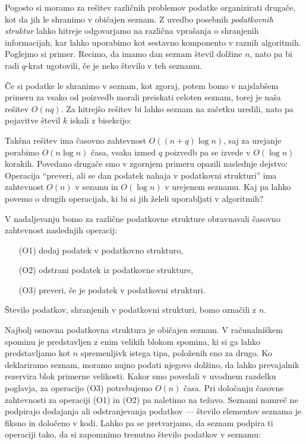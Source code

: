 Pogosto si moramo za rešitev različnih problemov podatke organizirati drugače,
kot da jih le shranimo v običajen seznam.
Z uvedbo posebnih \emph{podatkovnih struktur} lahko hitreje odgovarjamo na
različna vprašanja o shranjenih informacijah, kar lahko uporabimo kot sestavno
komponento v raznih algoritmih.
Poglejmo si primer.
Recimo, da imamo dan seznam števil dolžine $n$, nato pa bi radi $q$-krat
ugotovili, če je neko število v teh seznamu.


Če si podatke le shranimo v seznam, kot zgoraj, potem bomo v najslabšem primeru
za vsako od poizvedb morali preiskati celoten seznam, torej je naša rešitev
$O(nq)$.
Za hitrejšo rešitev bi lahko seznam na začetku uredili, nato pa pojavitve števil
$k$ iskali z bisekcijo:


Takšna rešitev ima časovno zahtevnost $O((n + q) \log n)$, saj za urejanje
porabimo $O(n \log n)$ časa, vsaka izmed $q$ poizvedb pa se izvede v $O(\log n)$
korakih.
Povedano drugače smo v zgornjem primeru opazili naslednje dejstvo:
Operacija \enquote{preveri, ali se dan podatek nahaja v podatkovni strukturi}
ima zahtevnost $O(n)$ v sezamu in $O(\log n)$ v urejenem seznamu.
Kaj pa lahko povemo o drugih operacijah, ki bi si jih želeli uporabljati v
algoritmih?

V nadaljevanju bomo za različne podatkovne strukture obravnavali časovno
zahtevnost naslednjih operacij:
\begin{enumerate}
\item[(O1)] dodaj podatek v podatkovno strukturo,
\item[(O2)] odstrani podatek iz podatkovne strukture,
\item[(O3)] preveri, če je podatek v podatkovni strukturi.
\end{enumerate}
Število podatkov, shranjenih v podatkovni strukturi, bomo označili z $n$.


Najbolj osnovna podatkovna struktura je običajen seznam.
V računalniškem spominu je predstavljen z enim velikih blokom spomina, ki si ga
lahko predstavljamo kot $n$ spremenljivk istega tipa, položenih eno za drugo.
Ko deklariramo seznam, moramo nujno podati njegovo dolžino, da lahko prevajalnik
rezervira blok primerne velikosti.
Kakor smo povedali v uvodnem razdelku poglavja, za operacijo (O3) potrebujemo
$O(n)$ časa.
Pri določanju časovne zahtevnosti za operaciji (O1) in (O2) pa naletimo na
težavo.
Seznami namreč ne podpirajo dodajanja ali odstranjevanja podatkov --- število
elementov seznama je fiksno in določeno v kodi.
Lahko pa se pretvarjamo, da seznam podpira ti operaciji tako, da si zapomnimo
trenutno število podatkov v seznamu:

